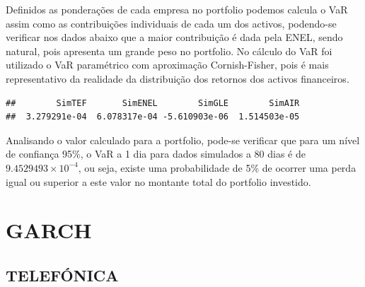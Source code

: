 \documentclass[
  12pt,
  a4paper,
  openany]{book}
\newenvironment{Shaded}{\begin{snugshade}}{\end{snugshade}}
\newcommand{\DataTypeTok}[1]{\textcolor[rgb]{0.13,0.29,0.53}{#1}}
\newcommand{\DecValTok}[1]{\textcolor[rgb]{0.00,0.00,0.81}{#1}}
\newcommand{\FloatTok}[1]{\textcolor[rgb]{0.00,0.00,0.81}{#1}}
\newcommand{\KeywordTok}[1]{\textcolor[rgb]{0.13,0.29,0.53}{\textbf{#1}}}
\newcommand{\NormalTok}[1]{#1}
\newcommand{\OperatorTok}[1]{\textcolor[rgb]{0.81,0.36,0.00}{\textbf{#1}}}
\newcommand{\StringTok}[1]{\textcolor[rgb]{0.31,0.60,0.02}{#1}}
\begin{document}
Definidos as ponderações de cada empresa no portfolio podemos calcula o VaR assim como as contribuições individuais de cada um dos activos, podendo-se verificar nos dados abaixo que a maior contribuição é dada pela ENEL, sendo natural, pois apresenta um grande peso no portfolio. No cálculo do VaR foi utilizado o VaR paramétrico com aproximação Cornish-Fisher, pois é mais representativo da realidade da
distribuição dos retornos dos activos financeiros.

\scriptsize

\begin{Shaded}
\end{Shaded}

\begin{verbatim}
##        SimTEF       SimENEL        SimGLE        SimAIR 
##  3.279291e-04  6.078317e-04 -5.610903e-06  1.514503e-05
\end{verbatim}

\normalsize

Analisando o valor calculado para a portfolio, pode-se verificar que para um nível de confiança 95\%, o VaR a 1 dia para dados simulados a 80 dias é de \ensuremath{9.4529493\times 10^{-4}}, ou seja, existe uma probabilidade de 5\% de ocorrer uma perda igual ou superior a este valor no montante total do portfolio investido.

\hypertarget{garch}{%
\section{GARCH}\label{garch}}

\hypertarget{telefuxf3nica}{%
\subsection{TELEFÓNICA}\label{telefuxf3nica}}
\end{document}
